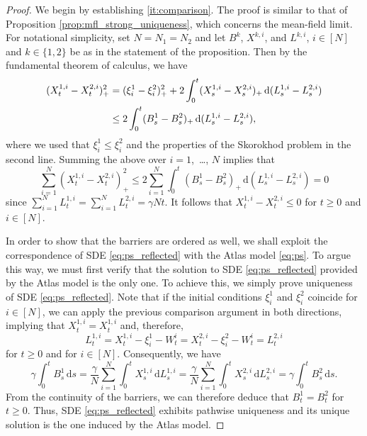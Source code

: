 \documentclass[11pt, a4paper]{article}
\theoremstyle{plain}
\theoremstyle{definition}
\theoremstyle{remark}
\numberwithin{equation}{section}
\renewcommand{\d}{\mathrm{d}}
\begin{document}
\begin{proof}
We begin by establishing \ref{it:comparison}. The proof is similar to that of Proposition \ref{prop:mfl_strong_uniqueness}, which concerns the mean-field limit. For notational simplicity, set $N = N_1 = N_2$ and let $B^k$, $X^{k, i}$, and $L^{k, i}$, $i \in [N]$ and $k \in \{1, 2\}$ be as in the statement of the proposition. Then by the fundamental theorem of calculus, we have
\begin{align} \label{eq:pos_part}
    (X^{1, i}_t - X^{2, i}_t)_+^2 &= (\xi^1_i - \xi^2_i)_+^2 + 2\int_0^t (X^{1, i}_s - X^{2, i}_s)_+ \, \d (L^{1, i}_s - L^{2, i}_s) \notag \\
    &\leq 2\int_0^t (B^1_s - B^2_s)_+ \, \d (L^{1, i}_s - L^{2, i}_s),
\end{align}
where we used that $\xi^1_i \leq \xi^2_i$ and the properties of the Skorokhod problem in the second line. Summing the above over $i = 1$,~\ldots, $N$ implies that
\begin{equation}
    \sum_{i = 1}^N (X^{1, i}_t - X^{2, i}_t)_+^2 \leq 2\sum_{i = 1}^N \int_0^t (B^1_s - B^2_s)_+ \, \d (L^{1, i}_s - L^{2, i}_s) = 0
\end{equation}
since $\sum_{i = 1}^N L^{1, i}_t = \sum_{i = 1}^N L^{2, i}_t = \gamma N t$. It follows that $X^{1, i}_t - X^{2, i}_t \leq 0$ for $t \geq 0$ and $i \in [N]$. 

In order to show that the barriers are ordered as well, we shall exploit the correspondence of SDE \eqref{eq:ps_reflected} with the Atlas model \eqref{eq:ps}. To argue this way, we must first verify that the solution to SDE \eqref{eq:ps_reflected} provided by the Atlas model is the only one. To achieve this, we simply prove uniqueness of SDE \eqref{eq:ps_reflected}. Note that if the initial conditions $\xi^1_i$ and $\xi^2_i$ coincide for $i \in [N]$, we can apply the previous comparison argument in both directions, implying that $X^{1, i}_t = X^{1, i}_t$ and, therefore,
\begin{equation*}
    L^{1, i}_t = X^{1, i}_t - \xi^1_i - W^i_t = X^{2, i}_t - \xi^2_i - W^i_t = L^{2, i}_t
\end{equation*}
for $t \geq 0$ and for $i \in [N]$. Consequently, we have
\begin{equation*}
    \gamma \int_0^t B^1_s \, \d s = \frac{\gamma}{N} \sum_{i = 1}^N \int_0^t X^{1, i}_s \, \d L^{1, i}_s = \frac{\gamma}{N} \sum_{i = 1}^N \int_0^t X^{2, i}_s \, \d L^{2, i}_s = \gamma \int_0^t B^2_s \, \d s.
\end{equation*}
From the continuity of the barriers, we can therefore deduce that $B^1_t = B^2_t$ for $t \geq 0$. Thus, SDE \eqref{eq:ps_reflected} exhibits pathwise uniqueness and its unique solution is the one induced by the Atlas model.


\end{proof}
\end{document}
